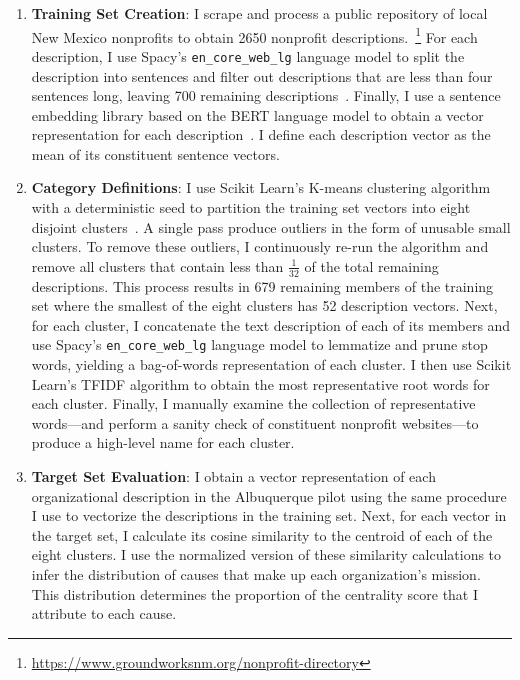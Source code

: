 \begin{enumerate}

 \item \textbf{Training Set Creation}: I scrape and process a public repository of local New Mexico nonprofits to obtain 2650 nonprofit descriptions.~\footnote{\url{https://www.groundworksnm.org/nonprofit-directory}} For each description, I use Spacy's \texttt{en\_core\_web\_lg} language model to split the description into sentences and filter out descriptions that are less than four sentences long, leaving 700 remaining descriptions~\cite{honnibal2020spacy}.
   Finally, I use a sentence embedding library based on the BERT language model to obtain a vector representation for each description~\cite{reimers-2019-sentence-bert}.
   I define each description vector as the mean of its constituent sentence vectors.

  \item \textbf{Category Definitions}: I use Scikit Learn's K-means clustering algorithm with a deterministic seed to partition the training set vectors into eight disjoint clusters~\cite{pedregosa2011scikit}.
A single pass produce outliers in the form of unusable small clusters.
To remove these outliers, I continuously re-run the algorithm and remove all clusters that contain less than $\frac{1}{32}$ of the total remaining descriptions.
This process results in 679 remaining members of the training set where the smallest of the eight clusters has 52 description vectors.
Next, for each cluster, I concatenate the text description of each of its members and use Spacy's \texttt{en\_core\_web\_lg} language model to lemmatize and prune stop words, yielding a bag-of-words representation of each cluster.
I then use Scikit Learn's TFIDF algorithm to obtain the most representative root words for each cluster.
Finally, I manually examine the collection of representative words---and perform a sanity check of constituent nonprofit websites---to produce a high-level name for each cluster.

  \item \textbf{Target Set Evaluation}:
    I obtain a vector representation of each organizational description in the Albuquerque pilot using the same procedure I use to vectorize the descriptions in the training set.
    Next, for each vector in the target set, I calculate its cosine similarity to the centroid of each of the eight clusters.
    I use the normalized version of these similarity calculations to infer the distribution of causes that make up each organization's mission.
    This distribution determines the proportion of the centrality score that I attribute to each cause.

\end{enumerate}

